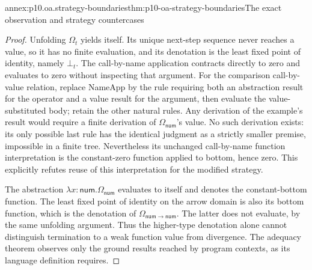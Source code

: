 \begin{annexitem}{annex:p10.oa.strategy-boundaries}{thm:p10-oa-strategy-boundaries}{The exact observation and strategy countercases}
\begin{proof}
Unfolding \(\Omega_t\) yields itself. Its unique next-step sequence
never reaches a value, so it has no finite evaluation, and its denotation
is the least fixed point of identity, namely \(\bot_t\).
The call-by-name application contracts directly to zero and evaluates
to zero without inspecting that argument.
For the comparison call-by-value relation, replace NameApp by the rule
requiring both an abstraction result for the operator and a value result
for the argument, then evaluate the value-substituted body; retain the
other natural rules. Any derivation of the example's result would require
a finite derivation of \(\Omega_{\mathsf{num}}\)'s value. No such
derivation exists: its only possible last rule has the identical
judgment as a strictly smaller premise, impossible in a finite tree.
Nevertheless its unchanged call-by-name function interpretation is the
constant-zero function applied to bottom, hence zero. This explicitly
refutes reuse of this interpretation for the modified strategy.

The abstraction \(\lambda x:\mathsf{num}.\Omega_{\mathsf{num}}\)
evaluates to itself and denotes the constant-bottom function. The
least fixed point of identity on the arrow domain is also its bottom
function, which is the denotation of \(\Omega_{\mathsf{num}\to\mathsf{num}}\).
The latter does not evaluate, by the same unfolding argument. Thus the
higher-type denotation alone cannot distinguish termination to a weak
function value from divergence. The adequacy theorem observes only the
ground results reached by program contexts, as its language definition
requires.
\end{proof}
\end{annexitem}
